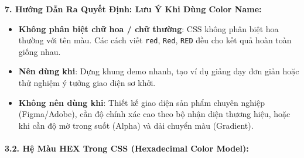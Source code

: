 \documentclass[11pt,oneside]{book}
\newcommand{\codeinline}[1]{\textcolor{accentOrange}{\texttt{#1}}}
\begin{document}
\textbf{7. Hướng Dẫn Ra Quyết Định: Lưu Ý Khi Dùng Color Name:}

\begin{tipBox}
\begin{itemize}[leftmargin=1.5em, itemsep=3pt, parsep=0pt]
    \item \textbf{Không phân biệt chữ hoa / chữ thường}: CSS không phân biệt hoa thường với tên màu. Các cách viết \codeinline{red}, \codeinline{Red}, \codeinline{RED} đều cho kết quả hoàn toàn giống nhau.
    \item \textbf{Nên dùng khi}: Dựng khung demo nhanh, tạo ví dụ giảng dạy đơn giản hoặc thử nghiệm ý tưởng giao diện sơ khởi.
    \item \textbf{Không nên dùng khi}: Thiết kế giao diện sản phẩm chuyên nghiệp (Figma/Adobe), cần độ chính xác cao theo bộ nhận diện thương hiệu, hoặc khi cần độ mờ trong suốt (Alpha) và dải chuyển màu (Gradient).
\end{itemize}
\end{tipBox}

\paragraph{3.2. Hệ Màu HEX Trong CSS (Hexadecimal Color Model):}
\end{document}

